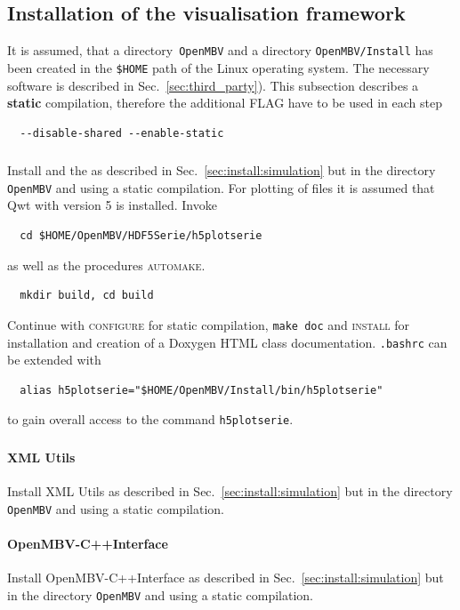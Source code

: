 \subsection{Installation of the visualisation framework\label{sec:install:visualisation}}
It is assumed, that a directory~\texttt{OpenMBV} and a directory \texttt{OpenMBV/Install} has been created in the \texttt{\$HOME} path of the Linux operating system. The necessary software is described in Sec.~\ref{sec:third_party}). This subsection describes a \textbf{static} compilation, therefore the additional FLAG have to be used in each step
\begin{verbatim}
  --disable-shared --enable-static
\end{verbatim}

\subsubsection{\HDF}
Install \HDF{} and the \HDFSerie{} as described in Sec.~\ref{sec:install:simulation} but in the directory \texttt{OpenMBV} and using a static compilation. For plotting of \HDF{} files it is assumed that Qwt with version 5 is installed. Invoke 
\begin{verbatim}
  cd $HOME/OpenMBV/HDF5Serie/h5plotserie
\end{verbatim}
as well as the procedures \textsc{automake}.
\begin{verbatim}
  mkdir build, cd build
\end{verbatim}
Continue with \textsc{configure} for static compilation, \texttt{make doc} and \textsc{install} for installation and creation of a Doxygen HTML class documentation. \texttt{.bashrc} can be extended with
\begin{verbatim}
  alias h5plotserie="$HOME/OpenMBV/Install/bin/h5plotserie"
\end{verbatim}
to gain overall access to the command \texttt{h5plotserie}.

\subsubsection{\OpenMBV{}}
\paragraph{XML Utils}
Install XML Utils as described in Sec.~\ref{sec:install:simulation} but in the directory \texttt{OpenMBV} and using a static compilation.

\paragraph{OpenMBV-C++Interface}
Install OpenMBV-C++Interface as described in Sec.~\ref{sec:install:simulation} but in the directory \texttt{OpenMBV} and using a static compilation.

